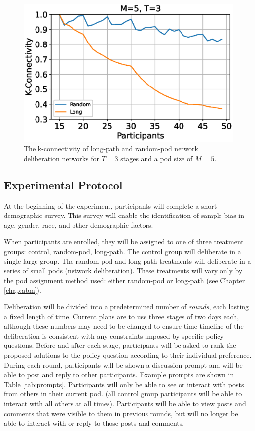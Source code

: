 \begin{figure}
\label{fig:kcon}
\includegraphics[width=5in]{fig/Experiment/fig-kcon.eps}
\caption{The k-connectivity of long-path and random-pod network deliberation
networks for $T=3$ stages and a pod size of $M=5$.}
\end{figure}

\subsection{Experimental Protocol}

At the beginning of the experiment, participants will complete a short
demographic survey.
This survey will enable the identification of sample bias in age, gender, race,
and other demographic factors.

When participants are enrolled, they will be assigned to one of three treatment
groups: control, random-pod, long-path.
The control group will deliberate in a single large group.
The random-pod and long-path treatments will deliberate in a series of small
pods (network deliberation).
These treatments will vary only by the pod assignment method used:
either random-pod or long-path (see Chapter \ref{chap:abm}).

Deliberation will be divided into a predetermined number of {\em rounds}, each lasting
a fixed length of time.
Current plans are to use three stages of two days each,
although these numbers may need to be changed
to ensure time timeline of the deliberation is consistent with any constraints
imposed by specific policy questions.
Before and after each stage, participants will be asked to rank the proposed
solutions to the policy question according to their individual preference.
During each round, participants will be shown a discussion prompt and will be
able to post and reply to other participants.
Example prompts are shown in Table \ref{tab:prompts}.
Participants will only be able to see or interact with posts from others in
their current pod.
(all control group participants will be able to interact with all others
at all times).
Participants will be able to view posts and comments that were visible to them
in previous rounds, but will no longer be able to interact with or reply to
those posts and comments.

